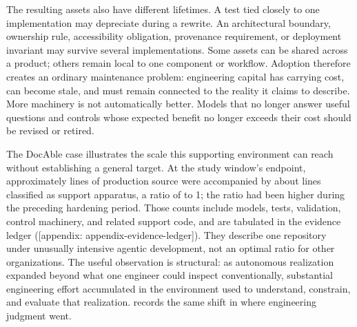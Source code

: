 The resulting assets also have different lifetimes. A test tied closely to one implementation may depreciate during a rewrite. An architectural boundary, ownership rule, accessibility obligation, provenance requirement, or deployment invariant may survive several implementations. Some assets can be shared across a product; others remain local to one component or workflow. Adoption therefore creates an ordinary maintenance problem: engineering capital has carrying cost, can become stale, and must remain connected to the reality it claims to describe. More machinery is not automatically better. Models that no longer answer useful questions and controls whose expected benefit no longer exceeds their cost should be revised or retired.

The DocAble case illustrates the scale this supporting environment can reach without establishing a general target. At the study window's endpoint, approximately  lines of production source were accompanied by about  lines classified as support apparatus, a ratio of  to 1; the ratio had been higher during the preceding hardening period. Those counts include models, tests, validation, control machinery, and related support code, and are tabulated in the evidence ledger ({[}appendix: appendix-evidence-ledger{]}). They describe one repository under unusually intensive agentic development, not an optimal ratio for other organizations. The useful observation is structural: as autonomous realization expanded beyond what one engineer could inspect conventionally, substantial engineering effort accumulated in the environment used to understand, constrain, and evaluate that realization.  records the same shift in where engineering judgment went.
